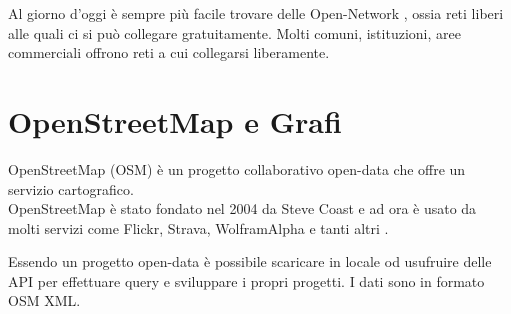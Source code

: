 \documentclass[12pt,a4paper,openright,twoside]{report}
\begin{document}
Al giorno d'oggi è sempre più facile trovare delle Open-Network \cite{K11}, ossia reti liberi alle quali ci si può collegare gratuitamente. Molti comuni, istituzioni, aree commerciali offrono reti a cui collegarsi liberamente.



\section{OpenStreetMap e Grafi}
OpenStreetMap (OSM) \cite{K12} è un progetto collaborativo open-data che offre un servizio cartografico.\\
OpenStreetMap è stato fondato nel 2004 da Steve Coast e ad ora è usato da molti servizi come Flickr, Strava, WolframAlpha e tanti altri \cite{K13}.

Essendo un progetto open-data è possibile scaricare in locale od usufruire delle API per effettuare query e sviluppare i propri progetti. I dati sono in formato OSM XML.
\end{document}
